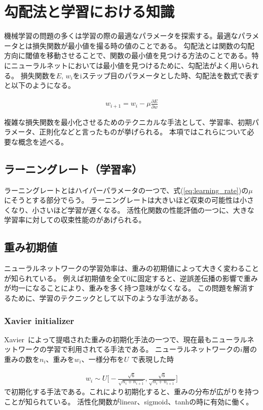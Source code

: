 \section{勾配法と学習における知識}
機械学習の問題の多くは学習の際の最適なパラメータを探索する。最適なパラメータとは損失関数が最小値を撮る時の値のことである。
勾配法とは関数の勾配方向に閾値を移動させることで、関数の最小値を見つける方法のことである。特にニューラルネットにおいては最小値を見つけるために、勾配法がよく用いられる。
損失関数を$ E $, $ w_i $をiステップ目のパラメータとした時、勾配法を数式で表すと以下のようになる。

\begin{eqnarray}
w_{i + 1} = w_i - \mu \frac{\partial E}{\partial w}
\label{eq:learning_rate}
\end{eqnarray}

複雑な損失関数を最小化させるためのテクニカルな手法として、学習率、初期パラメータ、正則化などと言ったものが挙げられる。
本項ではこれらについて必要な概念を述べる。
\subsection{ラーニングレート（学習率）}

ラーニングレートとはハイパーパラメータの一つで、式(\ref{eq:learning_rate})の$ \mu $にそうとする部分でらう。
ラーニングレートは大きいほど収束の可能性は小さくなり、小さいほど学習が遅くなる。
活性化関数の性能評価の一つに、大きな学習率に対しての収束性能のがあげられる。


\subsection{重み初期値}
ニューラルネットワークの学習効率は、重みの初期値によって大きく変わることが知られている。
例えば初期値を全て$ 0 $に固定すると、逆誤差伝播の影響で重みが均一になることにより、重みを多く持つ意味がなくなる。
この問題を解消するために、学習のテクニックとして以下のような手法がある。

\subsubsection{Xavier initializer}
Xavier~\cite{xavier}によって提唱された重みの初期化手法の一つで、現在最もニューラルネットワークの学習で利用されてる手法である。
ニューラルネットワークの$ i $層の重みの数を$ n_{i} $、重みを$ w_i $、一様分布を$U$ で表現した時

\begin{eqnarray}
w_{i} \sim U \bigl[ - \frac{\sqrt{6}}{ \sqrt{n_i + n_{i+1}} }, \frac{\sqrt{6}}{ \sqrt{n_i + n_{i+1} }} \bigr]
\end{eqnarray}
で初期化する手法である。これにより初期化すると、重みの分布が広がりを持つことが知られている。
活性化関数がlinear、sigmoid、tanhの時に有効に働く。

